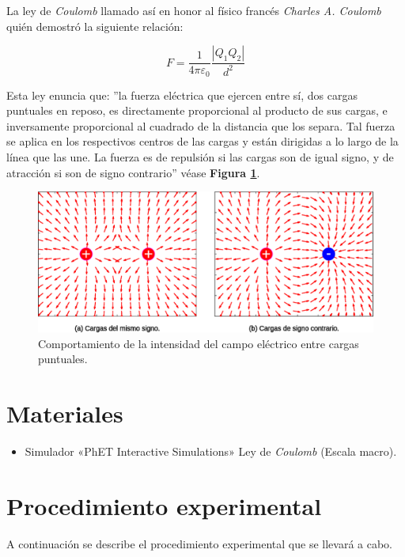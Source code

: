 \documentclass[letter,11pt]{article}
\begin{document}
La ley de \emph{Coulomb} llamado así en honor al físico francés \emph{Charles A.
Coulomb} quién demostró la siguiente relación:

\begin{equation}
    F = \frac{1}{4 \pi \varepsilon_0} \frac{| Q_1 Q_2 |}{d^2}
\label{coulomb}
\end{equation}

Esta ley enuncia que: ''la fuerza eléctrica que ejercen entre sí, dos cargas
puntuales en reposo, es directamente proporcional al producto de sus cargas, e
inversamente proporcional al cuadrado de la distancia que los separa. Tal fuerza
se aplica en los respectivos centros de las cargas y están dirigidas a lo largo
de la línea que las une. La fuerza es de repulsión si las cargas son de igual
signo, y de atracción si son de signo contrario'' véase
\textbf{Figura \ref{figura1}}.

\begin{figure}[!h]
\centering
\includegraphics[scale=0.58]{resources/figura1.eps}
\caption{Comportamiento de la intensidad del campo eléctrico entre cargas
puntuales.}
\label{figura1}
\end{figure}

\section{Materiales}
\begin{itemize}
\item Simulador «PhET Interactive Simulations» Ley de \emph{Coulomb} (Escala
macro).
\end{itemize}

\section{Procedimiento experimental}
A continuación se describe el procedimiento experimental que se llevará a
cabo.
\end{document}
